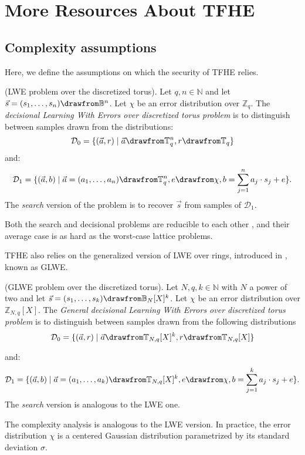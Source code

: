 \section{More Resources About TFHE}
\label{sec:appendix_fhe}


\subsection{Complexity assumptions}
\label{sec:complexity_assumptions}

Here, we define the assumptions on which the security of TFHE relies. 

\begin{definition}
	(LWE problem over the discretized torus). Let $q, n \in \mathbb N$ and let $\vec s = (s_1, \dots, s_n) \drawfrom \mathbb B^n$. Let $\chi$ be an error distribution over $\mathbb Z_q$. The \emph{decisional Learning With Errors over discretized torus problem} is to distinguish between samples drawn from the distributions: 
	\[
	\mathcal{D}_0 = \{(\vec a, r)\mid\vec a \drawfrom \mathbb T_q^n, r \drawfrom \mathbb T_q\}
	\] and: \[
	\mathcal{D}_1 = \{(\vec a, b)\mid\vec a = (a_1, \dots, a_n) \drawfrom \mathbb T_q^n, e \drawfrom \chi, b = \sum_{j=1}^n a_j \cdot s_j + e\}.
	\]
	The \emph{search} version of the problem is to recover $\vec s$ from samples of $\mathcal{D}_1$.
	\label{def:LWE}
\end{definition}
Both the search and decisional problems are reducible to each other \cite{Regev}, and their average case is as hard as the worst-case lattice problems.


TFHE also relies on the generalized version of LWE over rings, introduced in \cite{ITCS:BraGenVai12}, known as GLWE.

\begin{definition}
	(GLWE problem over the discretized torus). Let $N, q, k \in \mathbb N$ with $N$ a power of two and let $\vec s = (s_1, \dots, s_k) \drawfrom \mathbb B_N[X]^k$. Let $\chi$ be an error distribution over $\mathbb Z_{N, q}[X]$. The \emph{General decisional Learning With Errors over discretized torus problem} is to distinguish between samples drawn from the following distributions 
	\[
		\mathcal{D}_0 = \{(\vec a, r) \mid \vec a \drawfrom \mathbb T_{N, q}[X]^k, r \drawfrom \mathbb T_{N, q}[X]\}
		\]
		
		and: \[\mathcal{D}_1 = \{(\vec a, b) \mid \vec a = (a_1, \dots, a_k) \drawfrom \mathbb T_{N, q}[X]^k, e \drawfrom \chi, b = \sum_{j=1}^k a_j \cdot s_j + e\}.
	\]
	\label{def:GLWE}
	The \emph{search} version is analogous to the LWE one.
\end{definition}
%
The complexity analysis is analogous to the LWE version.
In practice, the error distribution $\chi$ is a centered Gaussian distribution parametrized by its standard deviation $\sigma$.





